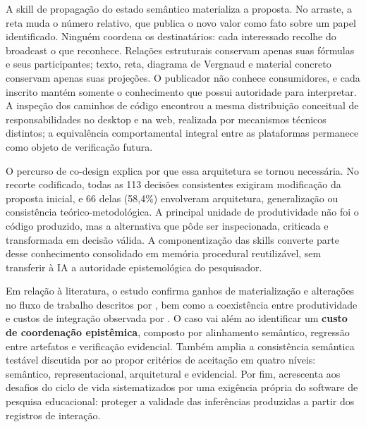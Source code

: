 \documentclass[preprint,12pt,authoryear]{elsarticle}
\begin{document}
A skill de propagação do estado semântico materializa a proposta. No arraste, a reta muda o número relativo, que publica o novo valor como fato sobre um papel identificado. Ninguém coordena os destinatários: cada interessado recolhe do broadcast o que reconhece. Relações estruturais conservam apenas suas fórmulas e seus participantes; texto, reta, diagrama de Vergnaud e material concreto conservam apenas suas projeções. O publicador não conhece consumidores, e cada inscrito mantém somente o conhecimento que possui autoridade para interpretar. A inspeção dos caminhos de código encontrou a mesma distribuição conceitual de responsabilidades no desktop e na web, realizada por mecanismos técnicos distintos; a equivalência comportamental integral entre as plataformas permanece como objeto de verificação futura.

O percurso de co-design explica por que essa arquitetura se tornou necessária. No recorte codificado, todas as 113 decisões consistentes exigiram modificação da proposta inicial, e 66 delas (58,4\%) envolveram arquitetura, generalização ou consistência teórico-metodológica. A principal unidade de produtividade não foi o código produzido, mas a alternativa que pôde ser inspecionada, criticada e transformada em decisão válida. A componentização das skills converte parte desse conhecimento consolidado em memória procedural reutilizável, sem transferir à IA a autoridade epistemológica do pesquisador.

Em relação à literatura, o estudo confirma ganhos de materialização e alterações no fluxo de trabalho descritos por \citet{ulfsnes2024transforming}, bem como a coexistência entre produtividade e custos de integração observada por \citet{song2024impact}. O caso vai além ao identificar um \textbf{custo de coordenação epistêmica}, composto por alinhamento semântico, regressão entre artefatos e verificação evidencial. Também amplia a consistência semântica testável discutida por \citet{zhang2024agilegen} ao propor critérios de aceitação em quatro níveis: semântico, representacional, arquitetural e evidencial. Por fim, acrescenta aos desafios do ciclo de vida sistematizados por \citet{gao2024challenges} uma exigência própria do software de pesquisa educacional: proteger a validade das inferências produzidas a partir dos registros de interação.
\end{document}
